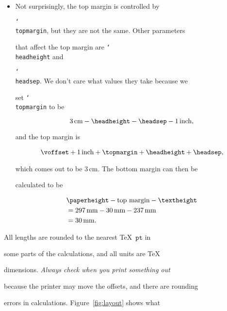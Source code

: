 \documentclass{bhamthesis}
\newcommand{\cm}{\mathrm{cm}}
\newcommand{\mm}{\mathrm{mm}}
\newcommand{\inch}{\mathrm{inch}}
\newcommand{\pt}{\mathtt{pt}}
\newcommand{\bksl}{\char`\\}
\newcommand{\cmd}[1]{\texttt{\bksl{}#1}}
\begin{document}
\begin{itemize}
\begin{itemize}
  \item Not surprisingly, the top margin is controlled by

    \cmd{topmargin}, but they are not the same.  Other parameters

    that affect the top margin are \cmd{headheight} and

    \cmd{headsep}.  We don't care what values they take because we

    set \cmd{topmargin} to be

    \begin{equation*}

     3\,\cm - \cmd{headheight} - \cmd{headsep} - 1\,\inch,

    \end{equation*}

    and the top margin is

    \begin{align*}

     \text{\cmd{voffset}}+1\,\inch+\text{\cmd{topmargin}}

     +\text{\cmd{headheight}}+\text{\cmd{headsep}},

    \end{align*}

    which comes out to be $3\,\cm$.  The bottom margin can then be

    calculated to be

    \begin{align*}

     &\text{\cmd{paperheight}}

     -\text{top margin}-\text{\cmd{textheight}}\\

     &= 297\,\mm - 30\,\mm - 237\,\mm \\

     &= 30\,\mm.

    \end{align*}

  \end{itemize}

  All lengths are rounded to the nearest \TeX\ $\pt$ in

  some parts of the calculations, and all units are \TeX\

  dimensions.  \emph{Always check when you print something out}

  because the printer may move the offsets, and there are rounding

  errors in calculations. Figure~\ref{fig:layout} shows what


\end{itemize}
\end{document}
